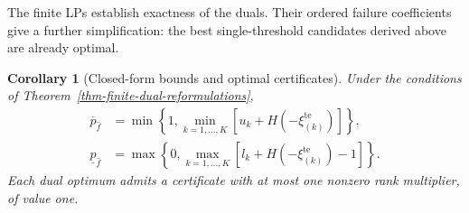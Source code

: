 \documentclass[review,11pt,3p,authoryear,nopreprintline]{elsarticle}
\newtheorem{corollary}{Corollary}
\begin{document}
The finite LPs establish exactness of the duals. Their ordered failure coefficients give a further simplification: the best single-threshold candidates derived above are already optimal.

\begin{corollary}[Closed-form bounds and optimal certificates]
  \label{thm-closed-form-bounds}
  Under the conditions of Theorem~\ref{thm-finite-dual-reformulations},
  \begin{align}
    \overline p_{\hat f}
    &=\min\left\{1,\min_{k=1,\ldots,K}[u_k+H\left(-\xi_{(k)}^{\mathrm{te}}\right)]\right\},
    \label{eq-dw-closed-upper}\\
    \underline p_{\hat f}
    &=\max\left\{0,\max_{k=1,\ldots,K}[l_k+H\left(-\xi_{(k)}^{\mathrm{te}}\right)-1]\right\}.
    \label{eq-dw-closed-lower}
  \end{align}
  Each dual optimum admits a certificate with at most one nonzero rank multiplier, of value one.
\end{corollary}
\end{document}
